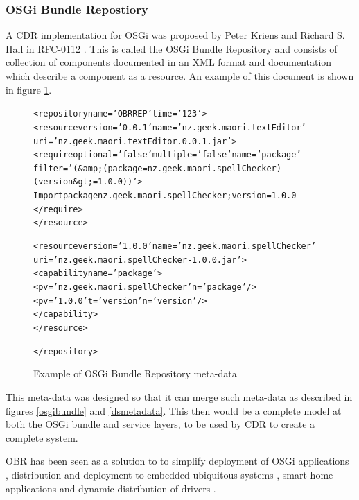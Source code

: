 \subsubsection{OSGi Bundle Repostiory}
A CDR implementation for OSGi was proposed by Peter Kriens and Richard S. Hall in RFC-0112 \cite{the_osgi_alliance_rfc-0112_2006}.
This is called the OSGi Bundle Repository and consists of collection of components documented in an XML format and documentation which describe a component as a resource.
An example of this document is shown in figure \ref{obrmetadata}.

\begin{figure}[htp]
\begin{center}
\begin{alltt}
<repository name='OBR REP' time='123'> 
  <resource version='0.0.1' name='nz.geek.maori.textEditor' 
  uri='nz.geek.maori.textEditor.0.0.1.jar'> 
    <require optional='false'  multiple='false'  name='package' 
        filter='(&amp;(package=nz.geek.maori.spellChecker)(version&gt;=1.0.0))'> 
      Import package nz.geek.maori.spellChecker ;version=1.0.0 
    </require> 
  </resource> 

  <resource version='1.0.0' name='nz.geek.maori.spellChecker' 
  uri='nz.geek.maori.spellChecker-1.0.0.jar'> 
    <capability name='package'> 
      <p v='nz.geek.maori.spellChecker' n='package'/> 
      <p v='1.0.0' t='version' n='version'/> 
    </capability> 
  </resource> 

</repository>
\end{alltt}
  \caption[OSGi Bundle Repository markup example]{Example of OSGi Bundle Repository meta-data}
  \label{obrmetadata}
\end{center}
\end{figure}

This meta-data was designed so that it can merge such meta-data as described in figures \ref{osgibundle} and \ref{dsmetadata}.
This then would be a complete model at both the OSGi bundle and service layers, to be used by CDR to create a complete system. 

OBR has been seen as a solution to to simplify deployment of OSGi applications \cite{jung_integrating_2007}, 
distribution and deployment to embedded ubiquitous systems \cite{jung_embedded_2006}, 
smart home applications \cite{gouin-vallerand_managing_2007} and 
dynamic distribution of drivers \cite{kriens_osgi_2008}. 

